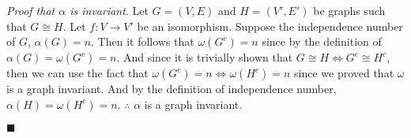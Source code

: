 \documentclass{article}
\begin{document}
\textit{Proof that \(\alpha \) is invariant}. Let \(G= (V,E)\) and \(H=(V',E')\) be graphs such that \(G \cong H\). Let \(f:V\rightarrow V'\) be an isomorphism. Suppose the independence number of \(G\),   \( \alpha(G)=n\). Then it follows that \(\omega(G^c) = n \) since by the definition of \(\alpha(G) = \omega(G^c)=n \).  And since it is trivially shown that \( G \cong H \iff G^c \cong H^c \), then we can use the fact that \( \omega(G^c)=n \iff \omega(H^c) = n \) since we proved that \( \omega \) is a graph invariant. And by the definition of independence number, \( \alpha(H) =  \omega(H^c) = n \). \(\therefore\) \( \alpha \) is a graph invariant. 

\begin{flushright}
\(\blacksquare\)
\end{flushright}
\end{document}
